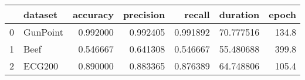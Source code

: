 \begin{tabular}{llrrrrr}
\toprule
{} &   dataset &  accuracy &  precision &    recall &   duration &  epoch \\
\midrule
0 &  GunPoint &  0.992000 &   0.992405 &  0.991892 &  70.777516 &  134.8 \\
1 &      Beef &  0.546667 &   0.641308 &  0.546667 &  55.480688 &  399.8 \\
2 &    ECG200 &  0.890000 &   0.883365 &  0.876389 &  64.748806 &  105.4 \\
\bottomrule
\end{tabular}
